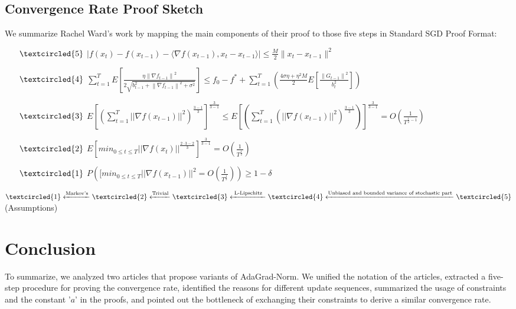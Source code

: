 \documentclass[14pt,onecolumn,letterpaper]{extarticle}
\begin{document}
\subsection{Convergence Rate Proof Sketch}
We summarize Rachel Ward's work
 by mapping the main components of their proof to those five steps in Standard SGD Proof Format:\\
 \begin{enumerate}
    \item [$\textcircled{5}$] $|f(x_t)-f(x_{t-1})-\langle\nabla f(x_{t-1}), x_t-x_{t-1}\rangle| \leq \frac{M}{2}\|x_t-x_{t-1}\|^2$
    \item [$\textcircled{4}$] $\sum_{t=1}^{T}E\left[\frac{\eta\left\|\nabla f_{t-1}\right\|^2}{2 \sqrt{b_{t-1}^2+\left\|\nabla f_{t-1}\right\|^2+\sigma^2}}\right] 
    \leq f_0-f^*+\sum_{t=1}^{T}\left(\frac{4 \sigma\eta+\eta^2 M}{2} E\left[\frac{\left\|G_{t-1}\right\|^2}{b_{t}^2}\right]\right)$\\
    \item [$\textcircled{3}$] 
    $E\left[\left(\sum_{t=1}^{T}||\nabla f(x_{t-1})||^2\right)^{\frac{3-1}{3}}\right]^{\frac{3}{3-1}}
    \leq E\left[\left(\sum_{t=1}^{T}\left(||\nabla f(x_{t-1})||^2\right)^{\frac{3-1}{3}}\right)\right]^{\frac{3}{3-1}}
    = O(\frac{1}{T^{\frac{1}{2} - 1}})$
    \item [$\textcircled{2}$] $E[min_{0\leq t \leq T}||\nabla f(x_{t})||^{\frac{2\cdot3-2}{3}}]^{\frac{3}{3-1}} = O(\frac{1}{T^{\frac{1}{2}}})$
    \item [$\textcircled{1}$] $P([min_{0 \leq t \leq T}||\nabla f(x_{t-1})||^2 = O(\frac{1}{T^\frac{1
    }{2}})) \geq 1 - \delta$\\\par
\end{enumerate} \par
$\textcircled{1} \xleftarrow{\text{Markov's}} \textcircled{2} \xleftarrow{\text{Trivial}} \textcircled{3} \xleftarrow{\text{ L-Lipschitz }} \textcircled{4} \xleftarrow{\text{Unbiased and bounded variance of stochastic part}} \textcircled{5}$(Assumptions)
\section{Conclusion}
To summarize, we analyzed two articles that propose variants of AdaGrad-Norm. We unified the notation of the articles, extracted a five-step procedure for proving the convergence rate, identified the reasons for different update sequences, summarized the usage of constraints and the constant '$a$' in the proofs, and pointed out the bottleneck of exchanging their constraints to derive a similar convergence rate. 
\end{document}
